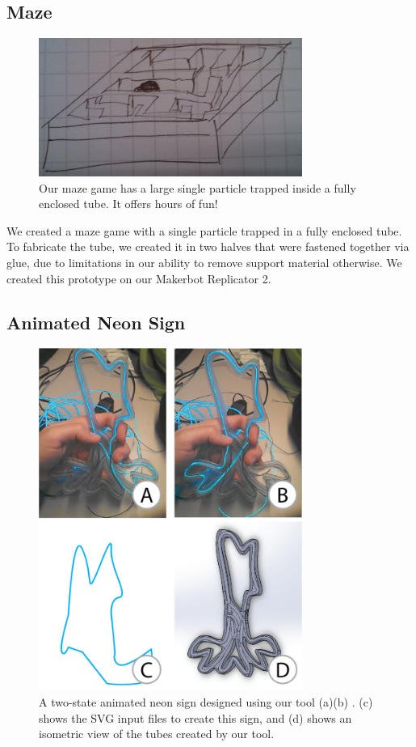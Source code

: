\subsection{Maze}

\begin{figure}[h]
\centering
    \includegraphics[width=3.4in]{figures/placeholder/maze.jpg}
\caption{Our maze game has a large single particle trapped inside a fully enclosed tube.  It offers hours of fun!}
\label{fig:maze}
\end{figure}

We created a maze game with a single particle trapped in a fully enclosed tube.  To fabricate the tube, we created it in two halves that were fastened together via glue, due to limitations in our ability to remove support material otherwise.  We created this prototype on our Makerbot Replicator 2.

\subsection{Animated Neon Sign}

\begin{figure}[h]
\centering
    \includegraphics[width=3.4in]{figures/sign.png}
\caption{A two-state animated neon sign designed using our tool (a)(b) .  (c) shows the SVG input files to create this sign, and (d) shows an isometric view of the tubes created by our tool. }
\label{fig:neon}
\end{figure}

